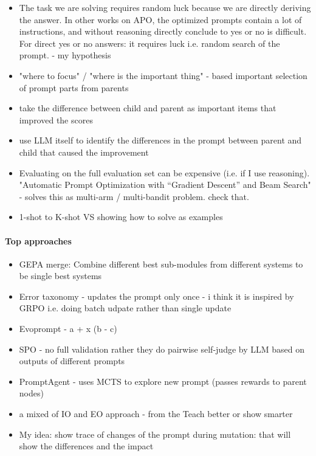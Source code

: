 \documentclass[12pt]{article}
\begin{document}
\begin{itemize}
    \item The task we are solving requires random luck because we are directly deriving the answer. 
    In other works on APO, the optimized prompts contain a lot of instructions, and without reasoning directly conclude to yes or no is difficult.
    For direct yes or no answers: it requires luck i.e. random search of the prompt. - my hypothesis
    \item "where to focus" / "where is the important thing" - based important selection of prompt parts from parents
    \item take the difference between child and parent as important items that improved the scores
    \item use LLM itself to identify the differences in the prompt between parent and child that caused the improvement 
    \item Evaluating on the full evaluation set can be expensive (i.e. if I use reasoning). "Automatic Prompt Optimization with “Gradient Descent” and Beam Search" - solves this as multi-arm / multi-bandit problem. check that.
    \item 1-shot to K-shot VS showing how to solve as examples
  \end{itemize}

\paragraph{Top approaches}
\begin{itemize}
  \item GEPA merge: Combine different best sub-modules from different systems to be single best systems
  \item Error taxonomy - updates the prompt only once - i think it is inspired by GRPO i.e. doing batch udpate rather than single update
  \item Evoprompt - a + x (b - c)
  \item SPO - no full validation rather they do pairwise self-judge by LLM based on outputs of different prompts
  \item PromptAgent - uses MCTS to explore new prompt (passes rewards to parent nodes)
  \item a mixed of IO and EO approach - from the Teach better or show smarter
  \item My idea: show trace of changes of the prompt during mutation: that will show the differences and the impact
\end{itemize}
\end{document}
